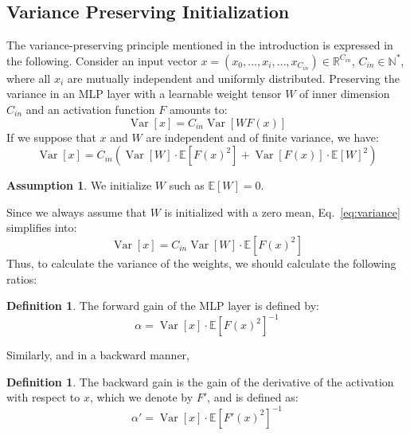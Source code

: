 \documentclass{article} %
\theoremstyle{plain}
\theoremstyle{definition}
\newtheorem{definition}[theorem]{Definition}
\newtheorem{assumption}[theorem]{Assumption}
\theoremstyle{remark}
\begin{document}
\subsection{Variance Preserving Initialization}
The variance-preserving principle \cite{he2015delving} mentioned in the introduction is expressed in the following.
Consider an input vector $x = (x_0, \dots, x_i, \dots, x_{C_{in}}) \in \mathbb{R}^{C_{in}}$, $C_{in} \in \mathbb{N}^*$, where all $x_i$ are mutually independent and uniformly distributed. Preserving the variance in an MLP layer with a learnable weight tensor $W$ of inner dimension $C_{in}$ and an activation function $F$ amounts to:%
\begin{equation}
\operatorname{Var}[x]=C_{i n} \operatorname{Var}[W F(x)] 
\end{equation}
If we suppose that $x$ and $W$ are independent and of finite variance, we have:
\begin{equation}
\label{eq:variance}
    \operatorname{Var}[x]=C_{i n} \left(\operatorname{Var}[W] \cdot \mathbb{E}\left[F(x)^2\right] + \operatorname{Var}[F(x)] \cdot \mathbb{E}\left[W\right]^2\right)
\end{equation}
\begin{assumption}
We initialize $W$ such as $ \mathbb{E}\left[W\right] = 0$.
\label{ass:weight_zero mean}
\end{assumption}
Since we always assume that $W$ is initialized with a zero mean, Eq.~\ref{eq:variance} simplifies into:
\begin{equation}
    \operatorname{Var}[x]=C_{i n} \operatorname{Var}[W] \cdot \mathbb{E}\left[F(x)^2\right]
\end{equation}
Thus, to calculate the variance of the weights, we should calculate the following ratios:
\begin{definition}
\label{def:gain_forward} 
The forward gain of the MLP layer is defined by:
\begin{equation}
    \alpha =  {\operatorname{Var}[x]}\cdot{\mathbb{E}\left[F(x)^2\right]}^{-1}
\end{equation}
\end{definition}
Similarly, and in a backward manner, 
\begin{definition}
\label{def:gain_backward} 
The backward gain is the gain  of the derivative of the activation with respect to $x$, which we denote by $F'$, and is defined as:
\begin{equation}
    \alpha' =  {\operatorname{Var}[x]} \cdot {\mathbb{E}\left[F'(x)^2\right]}^{-1}
\end{equation}
\end{definition}
\end{document}

